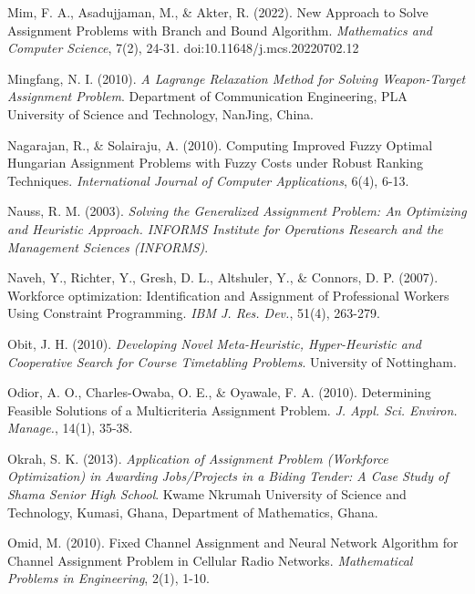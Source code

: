 \documentclass[11pt]{report}
\begin{document}
\begin{description}
		\item Mim, F. A., Asadujjaman, M., \& Akter, R. (2022). New Approach to Solve Assignment Problems
		with Branch and Bound Algorithm. \emph{Mathematics and Computer Science}, 7(2), 24-31.
		doi:10.11648/j.mcs.20220702.12
		
		\item Mingfang, N. I. (2010). \emph{A Lagrange Relaxation Method for Solving Weapon-Target Assignment
		Problem}. Department of Communication Engineering, PLA University of Science and Technology, NanJing, China.
		
		\item Nagarajan, R., \& Solairaju, A. (2010). Computing Improved Fuzzy Optimal Hungarian
		Assignment Problems with Fuzzy Costs under Robust Ranking Techniques. \emph{International
		Journal of Computer Applications}, 6(4), 6-13.
		
		\item Nauss, R. M. (2003). \emph{Solving the Generalized Assignment Problem: An Optimizing and Heuristic Approach. INFORMS Institute for Operations Research and the Management Sciences
		(INFORMS)}.
		
		\item Naveh, Y., Richter, Y., Gresh, D. L., Altshuler, Y., \& Connors, D. P. (2007). Workforce
		optimization: Identification and Assignment of Professional Workers Using Constraint
		Programming. \emph{IBM J. Res. Dev.}, 51(4), 263-279.
		
		\item Obit, J. H. (2010). \emph{Developing Novel Meta-Heuristic, Hyper-Heuristic and Cooperative Search
		for Course Timetabling Problems}. University of Nottingham.
		
		\item Odior, A. O., Charles-Owaba, O. E., \& Oyawale, F. A. (2010). Determining Feasible Solutions of
		a Multicriteria Assignment Problem. \emph{J. Appl. Sci. Environ. Manage.}, 14(1), 35-38.
		
		\item Okrah, S. K. (2013). \emph{Application of Assignment Problem (Workforce Optimization) in Awarding Jobs/Projects in a Biding Tender: A Case Study of Shama Senior High School}. Kwame Nkrumah University of Science and Technology, Kumasi, Ghana, Department of Mathematics, Ghana. 
		
		\item Omid, M. (2010). Fixed Channel Assignment and Neural Network Algorithm for Channel
		Assignment Problem in Cellular Radio Networks. \emph{Mathematical Problems in Engineering}, 2(1), 1-10.
		

\end{description}
\end{document}
